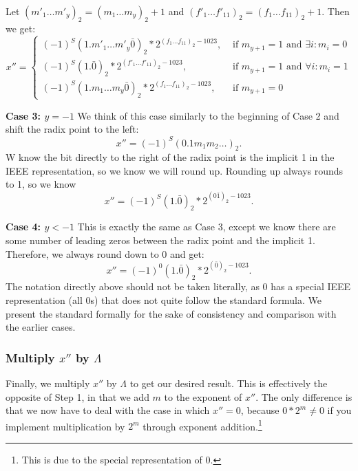 \documentclass[11pt]{scrartcl} %
\begin{document}
Let $(m'_1 \hdots m'_y)_2 = (m_1 \hdots m_y)_2 + 1$ and $(f'_1 \hdots f'_{11})_2 = (f_1 \hdots f_{11})_2 + 1$. Then we get:
\begin{equation}
    x'' =
        \begin{cases}
            (-1)^S (1.m'_1 \hdots m'_y \bar{0})_2 * 2^{(f_1 \hdots f_{11})_2-1023}, & \text{ if } m_{y+1} = 1 \text{ and } \exists i: m_i = 0 \\
            (-1)^S (1.\bar{0})_2 * 2^{(f'_1 \hdots f'_{11})_2-1023}, & \text{ if } m_{y+1} = 1 \text{ and } \forall i: m_i = 1 \\
            (-1)^S (1.m_1 \hdots m_y \bar{0})_2 * 2^{(f_1 \hdots f_{11})_2-1023}, & \text{ if } m_{y+1} = 0
        \end{cases}
\end{equation}

\textbf{Case 3: $y = -1$} \newline
We think of this case similarly to the beginning of Case 2 and shift the radix point to the left:
\[ x'' = (-1)^S (0.1m_1 m_2 \hdots)_2. \]
W know the bit directly to the right of the radix point is the implicit 1 in the IEEE representation, so we know we will round up. Rounding up always rounds to 1, so we know
\[ x'' = (-1)^S (1.\bar{0})_2 * 2^{(0\bar{1})_2 - 1023}. \]

\textbf{Case 4: $y < -1$} \newline
This is exactly the same as Case 3, except we know there are some number of leading zeros between the radix point and the implicit 1. Therefore, we always round down to 0 and get:
\[ x'' = (-1)^0 (1.\bar{0})_2 * 2^{(\bar{0})_2 - 1023}. \]
The notation directly above should not be taken literally, as 0 has a special IEEE representation (all 0s) that does not quite follow the standard formula. We present the standard formally for the sake of consistency and comparison with the earlier cases. \newline

\subsubsection{Multiply $x''$ by $\Lambda$}
Finally, we multiply $x''$ by $\Lambda$ to get our desired result. This is effectively the opposite of Step 1, in that we add $m$ to the exponent of $x''$. The only difference is that we now have to deal with the case in which $x'' = 0$, because $0*2^m \neq 0$ if you implement multiplication by $2^m$ through exponent addition.\footnote{This is due to the special representation of 0.}
\end{document}
